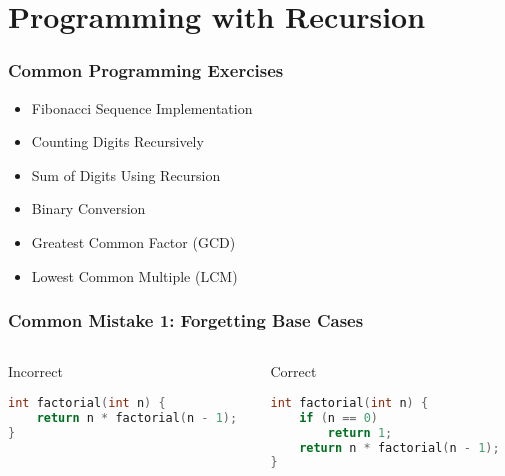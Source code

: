 \documentclass{beamer}
\begin{document}
\section{Programming with Recursion}

\begin{frame}
\frametitle{Common Programming Exercises}
\begin{itemize}
    \item Fibonacci Sequence Implementation
    \item Counting Digits Recursively
    \item Sum of Digits Using Recursion
    \item Binary Conversion
    \item Greatest Common Factor (GCD)
    \item Lowest Common Multiple (LCM)
\end{itemize}
\end{frame}

\begin{frame}[fragile]
\frametitle{Common Mistake 1: Forgetting Base Cases}
\begin{columns}
\begin{column}{0.48\textwidth}
\begin{block}{Incorrect}
\begin{lstlisting}[language=C++]
int factorial(int n) {
    return n * factorial(n - 1);
}
\end{lstlisting}
\end{block}
\end{column}

\begin{column}{0.48\textwidth}
\begin{block}{Correct}
\begin{lstlisting}[language=C++]
int factorial(int n) {
    if (n == 0) 
        return 1;
    return n * factorial(n - 1);
}
\end{lstlisting}
\end{block}
\end{column}
\end{columns}
\end{frame}
\end{document}
